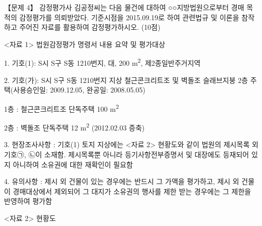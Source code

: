\begin{longquestion}{【문제 4】}
감정평가사 김공정씨는 다음 물건에 대하여 ○○지방법원으로부터 경매 목적의 감정평가를 의뢰받았다. 기준시점을 2015.09.19로 하여 관련법규 및 이론을 참작하고 주어진 자료를 활용하여 감정평가하시오. (10점) \par
<자료 1> 법원감정평가 명령서 내용 요약 및 평가대상 \par
1. 기호(1): S시 S구 S동 1210번지, 대, 200 m\textsuperscript{2}, 제2종일반주거지역 \par
2. 기호(가): S시 S구 S동 1210번지 지상 철근콘크리트조 및 벽돌조 슬래브지붕 2층 주택(사용승인일: 2009.12.05, 완공일: 2008.05.05) \par
1층 : 철근콘크리트조 단독주택 100 m\textsuperscript{2} \par
2층 : 벽돌조 단독주택 12 m\textsuperscript{2} (2012.02.03 증축) \par
3. 현장조사사항 : 기호(1) 토지 지상에는 <자료 2> 현황도와 같이 법원의 제시목록 외 기호㉠, ㉡이 소재함. 제시목록뿐 아니라 등기사항전부증명서 및 대장에도 등재되어 있지 아니하여 소유권에 대한 재확인이 필요함 \par
4. 유의사항 : 제시 외 건물이 있는 경우에는 반드시 그 가액을 평가하고, 제시 외 건물이 경매대상에서 제외되어 그 대지가 소유권의 행사를 제한 받는 경우에는 그 제한을 반영하여 평가함 \par
<자료 2> 현황도 \par
{}


\end{longquestion}
